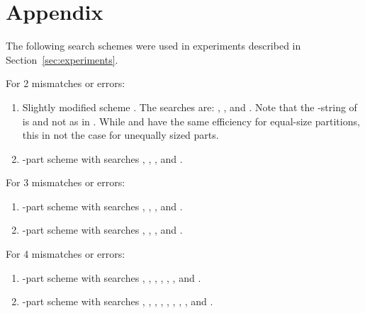 \documentclass[12pt]{article}
\begin{document}
\newpage
\section*{Appendix}
The following search schemes were used in experiments described in
Section~\ref{sec:experiments}. 

\noindent
For 2 mismatches or errors:
\begin{enumerate}
\item Slightly modified scheme .
The searches are:
, ,
and .
Note that the -string of  is  and not  as in .
While   and  have the same efficiency for equal-size
partitions, this in not the case for unequally sized parts.
\item -part scheme with searches
, , \linebreak[4], and
.
\end{enumerate}

\vspace{5mm}
\noindent
For 3 mismatches or errors:
\begin{enumerate}
\item -part scheme with searches 
, , \linebreak[4], and
.
\item -part scheme with searches
, , \linebreak[4], and
.
\end{enumerate}

\vspace{5mm}
\noindent
For 4 mismatches or errors:
\begin{enumerate}
\item -part scheme with searches
, , 
\linebreak[4], , 
, \linebreak[4], 
 and .

\item -part scheme with searches
, , 
, , 
, , 
, ,
 and .
\end{enumerate}
\end{document}
